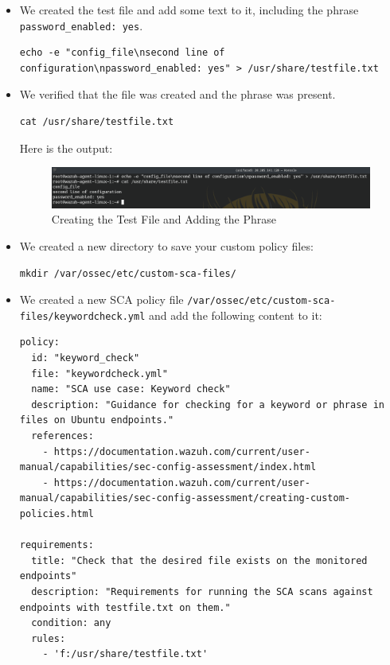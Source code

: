 \begin{itemize}
    \item We created the test file and add some text to it, including the phrase \texttt{password\_enabled: yes}.
          \begin{verbatim}
echo -e "config_file\nsecond line of configuration\npassword_enabled: yes" > /usr/share/testfile.txt
        \end{verbatim}

    \item We verified that the file was created and the phrase was present.
          \begin{verbatim}
cat /usr/share/testfile.txt
        \end{verbatim}
          Here is the output:
          \begin{figure} [H]
              \centering
              \includegraphics[width=\textwidth]{images/sca/sca-1.png}
              \caption{Creating the Test File and Adding the Phrase}
              \label{fig:sca-1}
          \end{figure}
    \item We created a new directory to save your custom policy files:
          \begin{verbatim}
mkdir /var/ossec/etc/custom-sca-files/
        \end{verbatim}

    \item We created a new SCA policy file \texttt{/var/ossec/etc/custom-sca-files/keywordcheck.yml} and add the following content to it:
        \begin{verbatim}
policy:
  id: "keyword_check"
  file: "keywordcheck.yml"
  name: "SCA use case: Keyword check"
  description: "Guidance for checking for a keyword or phrase in files on Ubuntu endpoints."
  references:
    - https://documentation.wazuh.com/current/user-manual/capabilities/sec-config-assessment/index.html
    - https://documentation.wazuh.com/current/user-manual/capabilities/sec-config-assessment/creating-custom-policies.html

requirements:
  title: "Check that the desired file exists on the monitored endpoints"
  description: "Requirements for running the SCA scans against endpoints with testfile.txt on them."
  condition: any
  rules:
    - 'f:/usr/share/testfile.txt'


\end{verbatim}
\end{itemize}
